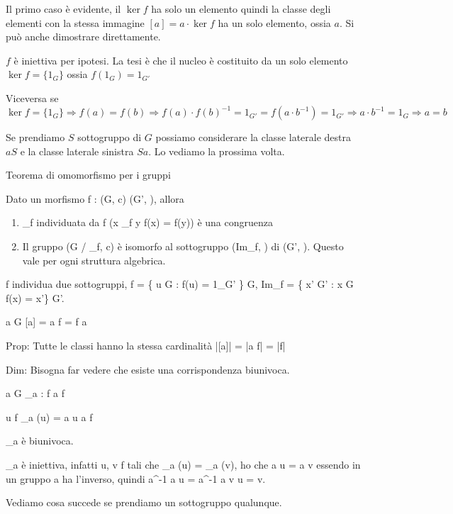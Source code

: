 Il primo caso \`e evidente, il $\ker f$ ha solo un elemento quindi la classe degli elementi con la stessa immagine $[a] = a \cdot \ker f$ ha un solo elemento, ossia $a$. Si pu\`o anche dimostrare direttamente.

$f$ \`e iniettiva per ipotesi. La tesi \`e che il nucleo \`e costituito da un solo elemento $\ker f = \{ 1_G \} $ ossia $f(1_G) = 1_{G'}$

Viceversa se $\ker f = \{ 1_G \} \Rightarrow f(a) = f(b) \Rightarrow f(a) \cdot f(b)^{-1} = 1_{G'} = f(a \cdot b^{-1}) = 1_{G'} \Rightarrow a \cdot b^{-1} = 1_G \Rightarrow a = b$

Se prendiamo $S$ sottogruppo di $G$ possiamo considerare la classe laterale destra $a S$ e la classe laterale sinistra $S a$. Lo vediamo la prossima volta. 

Teorema di omomorfismo per i gruppi

Dato un morfismo f : (G, c\dto) \to (G', \ast), allora 
\begin{enumerate}
    \item \varepsilon_f individuata da f (x \varepsilon_f y \Leftrightarrow f(x) = f(y)) \`e una congruenza
    \item Il gruppo (G / \varepsilon_f, c\dto) \`e isomorfo al sottogruppo (Im_f, \ast) di (G', \ast). Questo vale per ogni struttura algebrica.
\end{enumerate}

f individua due sottogruppi, \ker f = \{ u \in G : f(u) = 1_{G'} \} \le G, Im_f = \{ x' \in G' : \exists x \in G f(x) = x'\} \le G'. 

\forall a \in G [a] = a \cdot \ker f = \ker f \cdot a

Prop:
Tutte le classi hanno la stessa cardinalit\`a |[a]| = |a \cdot \ker f| = |\ker f|

Dim:
Bisogna far vedere che esiste una corrispondenza biunivoca.

\forall a \in G \varphi_a : \ker f \to a \cdot \ker f

\forall u \in \ker f \varphi_a (u) = a \cdot u \in a \cdot \ker f

\varphi_a \`e biunivoca. 

\varphi_a \`e iniettiva, infatti \forall u, v \in \ker f tali che \varphi_a (u) = \varphi_a (v), ho che a \cdot u = a \cdot v \Rightarrow essendo in un gruppo a ha l'inverso, quindi a^{-1} \cdot a \cdot u = a^{-1} \cdot a \cdot v \Rightarrow u = v.

Vediamo cosa succede se prendiamo un sottogruppo qualunque.

